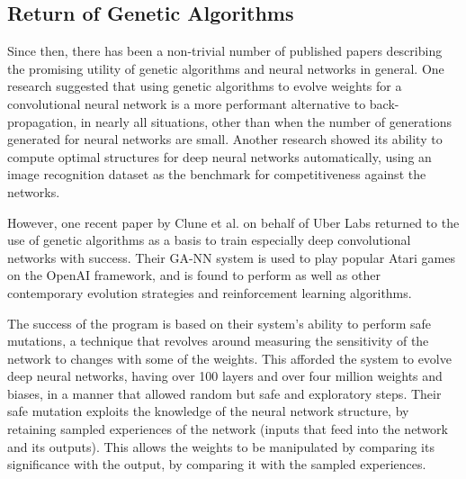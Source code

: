 \documentclass[12pt,a4paper]{article}
\begin{document}

    \subsection{Return of Genetic Algorithms}

        Since then, there has been a non-trivial number of published papers describing the promising utility of genetic algorithms and neural networks in general.
        One research suggested that using genetic algorithms to evolve weights for a convolutional neural network is a more performant alternative to back-propagation, in nearly all situations, other than when the number of generations generated for neural networks are small. \cite{perez_apply_nodate} Another research showed its ability to compute optimal structures for deep neural networks automatically, using an image recognition dataset as the benchmark for competitiveness against the networks. \cite{xie_genetic_2017}
        
        

        However, one recent paper by Clune et al. on behalf of Uber Labs returned to the use of genetic algorithms as a basis to train especially deep convolutional networks with success. \cite{such_deep_2017} Their GA-NN system is used to play popular Atari games on the OpenAI framework, and is found to perform as well as other contemporary evolution strategies and reinforcement learning algorithms. 

        The success of the program is based on their system's ability to perform safe mutations, a technique that revolves around measuring the sensitivity of the network to changes with some of the weights. \cite{lehman_safe_2017} This afforded the system to evolve deep neural networks, having over 100 layers and over four million weights and biases, in a manner that allowed random but safe and exploratory steps. Their safe mutation exploits the knowledge of the neural network structure, by retaining sampled experiences of the network (inputs that feed into the network and its outputs). This allows the weights to be manipulated by comparing its significance with the output, by comparing it with the sampled experiences. 
\end{document}
